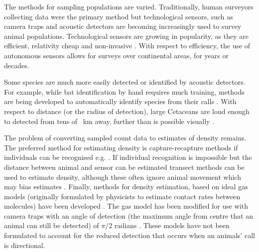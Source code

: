 \documentclass[a4paper,10pt,reqno,oneside]{amsart}
\begin{document}
The methods for sampling populations are varied. Traditionally, human surveyors collecting data were the primary method but technological sensors, such as camera traps \citep{ahumada2011community, rowcliffe2008surveys} and acoustic detectors \citep{ofarrel1999comparison, jones2011indicator, mellinger2007fixed} are becoming increasingly used to survey animal populations.  Technological sensors are growing in popularity, as they are efficient, relativity cheap and non-invasive \citep{gese2001monitoring, o2003crouching, silveira2003camera}. With respect to efficiency, the use of autonomous sensors allows for surveys over continental areas, for years or decades. 

Some species are much more easily detected or identified by acoustic detectors. For example, while bat identification by hand requires much training, methods are being developed to automatically identify species from their calls \citep{walters_2012, Adams_2010}. With respect to distance (or the radius of detection), large Cetaceans are loud enough to detected from tens of \SI{}{\kilo \meter} away, further than is possible visually \cite{clark1995application, barlow2005estimates, mcdonald2004difar}.  


The problem of converting sampled count data to estimates of density remains. The preferred method for estimating density is capture-recapture methods \citep{leslie1953estimation,schwarz1999} if individuals can be recognised e.g. \citep{karanth1995, trolle2003estimation, soisalo2006estimating, trolle2007camera}. If individual recognition is impossible but the distance between animal and sensor can be estimated transect methods can be used to estimate density, although these often ignore animal movement which may bias estimates \citep{barlow2005estimates, marques2011estimating}. Finally, methods for density estimation, based on ideal gas models (originally formulated by physicists to estimate contact rates between molecules) have been developed \citep{yapp1956theory, Hutchinson_Waser_2007}. The gas model has been modified for use with camera traps with an angle of detection (the maximum angle from centre that an animal can still be detected)  of $\pi/2$ radians \citep{rowcliffe2008estimating}. These models have not been formulated to account for the reduced detection that occurs when an animals' call is directional.
\end{document}
